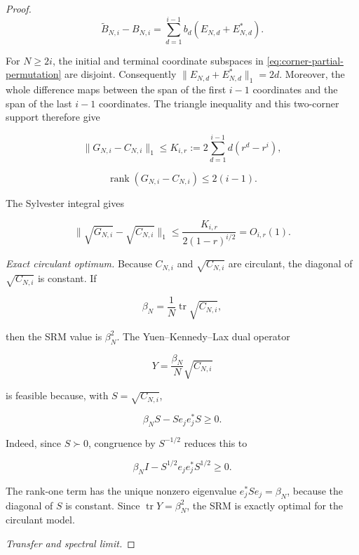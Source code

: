 \begin{proof}
\begin{equation}\label{eq:corner-partial-permutation}
\widetilde B_{N,i}-B_{N,i}
=\sum_{d=1}^{i-1}b_d(E_{N,d}+E_{N,d}^*).
\end{equation}

For \(N\ge2i\), the initial and terminal coordinate subspaces in
\eqref{eq:corner-partial-permutation} are disjoint. Consequently
\(\|E_{N,d}+E_{N,d}^*\|_1=2d\). Moreover, the whole difference maps between
the span of the first \(i-1\) coordinates and the span of the last \(i-1\)
coordinates. The triangle inequality and this two-corner support therefore give

\begin{equation}\label{eq:circulant-trace-perturbation}
\|G_{N,i}-C_{N,i}\|_1
\le K_{i,r}:=2\sum_{d=1}^{i-1}d(r^d-r^i),
\end{equation}

\begin{equation}\label{eq:circulant-rank-perturbation}
\operatorname{rank}(G_{N,i}-C_{N,i})\le2(i-1).
\end{equation}

The Sylvester integral gives

\begin{equation}\label{eq:sqrt-trace-perturbation}
\|\sqrt{G_{N,i}}-\sqrt{C_{N,i}}\|_1
\le\frac{K_{i,r}}{2(1-r)^{i/2}}=O_{i,r}(1).
\end{equation}

\emph{Exact circulant optimum.}
Because \(C_{N,i}\) and \(\sqrt{C_{N,i}}\) are circulant, the diagonal of \(\sqrt{C_{N,i}}\) is constant. If

\[
\beta_N=\frac1N\operatorname{tr}\sqrt{C_{N,i}},
\]

then the SRM value is \(\beta_N^2\). The Yuen--Kennedy--Lax dual operator

\[
Y=\frac{\beta_N}{N}\sqrt{C_{N,i}}
\]

is feasible because, with \(S=\sqrt{C_{N,i}}\),

\[
\beta_NS-Se_je_j^*S\ge0.
\]

Indeed, since \(S\succ0\), congruence by \(S^{-1/2}\) reduces this to

\[
\beta_N I-S^{1/2}e_je_j^*S^{1/2}\ge0.
\]

The rank-one term has the unique nonzero eigenvalue
\(e_j^*Se_j=\beta_N\), because the diagonal of \(S\) is constant. Since
\(\operatorname{tr}Y=\beta_N^2\), the SRM is exactly optimal for the
circulant model.

\emph{Transfer and spectral limit.}


\end{proof}
